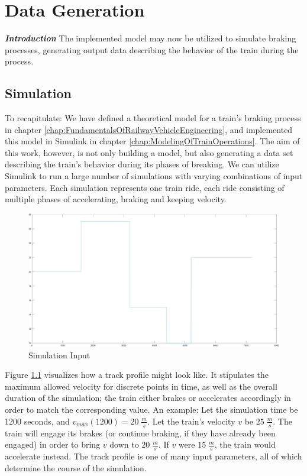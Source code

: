 \chapter{Data Generation}
\label{chap:DataGeneration}
\par\noindent
\textit{\textbf{Introduction}} The implemented model may now be utilized to simulate braking processes, generating output data describing the behavior of the train during the process. 

\section{Simulation}
\label{sec:Simulation}
\par\noindent
To recapitulate: We have defined a theoretical model for a train's braking process in chapter \ref{chap:FundamentalsOfRailwayVehicleEngineering}, and implemented this model in Simulink in chapter \ref{chap:ModelingOfTrainOperations}. The aim of this work, however, is not only building a model, but also generating a data set describing the train's behavior during its phases of breaking. We can utilize Simulink to run a large number of simulations with varying combinations of input parameters. Each simulation represents one train ride, each ride consisting of multiple phases of accelerating, braking and keeping velocity. 

\begin{figure}[htb!]
	\centering
	\includegraphics[width=\linewidth]{./pic/input}
	\caption{Simulation Input}
	\label{fig:siminput}
\end{figure}

\par\noindent
Figure \ref{fig:siminput} visualizes how a track profile might look like. It stipulates the maximum allowed velocity for discrete points in time, as well as the overall duration of the simulation; the train either brakes or accelerates accordingly in order to match the corresponding value. An example: Let the simulation time be 1200 seconds, and $v_{max}(1200)=20 \; \frac{m}{s}$. Let the train's velocity $v$ be $25 \; \frac{m}{s}$. The train will engage its brakes (or continue braking, if they have already been engaged) in order to bring $v$ down to $20 \; \frac{m}{s}$. If $v$ were $15 \; \frac{m}{s}$, the train would accelerate instead. The track profile is one of many input parameters, all of which determine the course of the simulation. 

